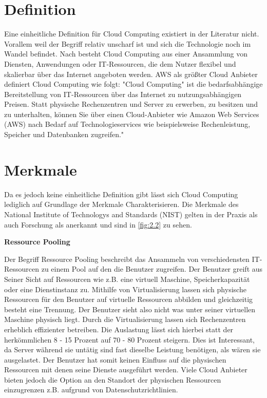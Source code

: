 \section{Definition}
Eine einheitliche Definition  für Cloud Computing existiert in der Literatur nicht. Vorallem weil der Begriff relativ unscharf ist und sich die Technologie noch im Wandel befindet. Nach besteht Cloud Computing aus einer Ansammlung von Diensten, Anwendungen oder IT-Ressourcen, die dem Nutzer flexibel und skalierbar über das Internet angeboten werden. AWS als größter Cloud Anbieter definiert Cloud Computing wie folgt: "Cloud Computing" ist die bedarfsabhängige Bereitstellung von IT-Ressourcen über das Internet zu nutzungsabhängigen Preisen. Statt physische Rechenzentren und Server zu erwerben, zu besitzen und zu unterhalten, können Sie über einen Cloud-Anbieter wie Amazon Web Services (AWS) nach Bedarf auf Technologieservices wie beispielsweise Rechenleistung, Speicher und Datenbanken zugreifen."\cite*[]{AWSCC}

\section{Merkmale}
Da es jedoch keine einheitliche Definition gibt lässt sich Cloud Computing lediglich auf Grundlage der Merkmale Charakterisieren. Die Merkmale des National Institute of Technologys and Standards (NIST) gelten in der Praxis als auch Forschung als anerkannt und sind in \autoref{fig:2.2} zu sehen. 

\textbf{Ressource Pooling}

Der Begriff Ressource Pooling beschreibt das Ansammeln von verschiedensten IT-Ressourcen zu einem Pool auf den die Benutzer zugreifen. Der Benutzer greift aus Seiner Sicht auf Ressourcen wie z.B. eine virtuell Maschine, Speicherkapazität oder eine Dienstinstanz zu. Mithilfe von Virtualisierung lassen sich physische Ressourcen für den Benutzer auf virtuelle Ressourcen abbilden und gleichzeitig besteht eine Trennung. Der Benutzer sieht also nicht was unter seiner virtuellen Maschine physisch liegt. Durch die Virtualisierung lassen sich Rechenzentren erheblich effizienter betreiben. Die Auslastung lässt sich hierbei statt der herkömmlichen 8 - 15 Prozent auf 70 - 80 Prozent steigern. Dies ist Interessant, da Server während sie untätig sind fast dieselbe Leistung benötigen, als wären sie ausgelastet\cite*[]{VMware}. Der Benutzer hat somit keinen Einfluss auf die physischen Ressourcen mit denen seine Dienste ausgeführt werden. Viele Cloud Anbieter bieten jedoch die Option an den Standort der physischen Ressourcen einzugrenzen z.B. aufgrund von Datenschutzrichtlinien. \cite*[]{DAAS}


